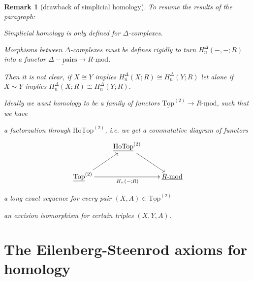 \documentclass[11pt]{book}
\numberwithin{dummy}{section}
\newtheorem{remark}[theorem]{Remark}
\theoremstyle{nonumberbreak}
\newcommand{\Rmod}{\underline{R\textrm{-}\mathrm{mod}}}
\newcommand{\toptwo}{\underline{\mathrm{Top}}^{(2)}}
\newcommand{\hotoptwo}{\underline{\mathrm{HoTop}}^{(2)}}
\newcommand{\la}{\longrightarrow}
\begin{document}
\begin{spacing}{1.4}
\begin{remark}[drawback of simplicial homology] 
To resume the results of the paragraph:
\begin{compactenum}
\item Simplicial homology is only defined for $\Delta$-complexes.
\item Morphisms between $\Delta$-complexes must be defines rigidly to turn $H_n^{\Delta}(-,-;R)$ into a functor $\underline{\Delta-\mathrm{pairs}} \la \Rmod$.
\item Then it is not clear, if $X \cong Y$ implies $H_n^{\Delta}(X;R) \cong H_n^{\Delta}(Y;R)$ let alone if $X \sim Y$ implies $H_n^{\Delta}(X;R) \cong H_n^{\Delta}(Y;R)$.
\item Ideally we want homology to be a family of functors $\toptwo \la \Rmod$, such that we have
\begin{compactenum}
\item a factorzation through $\hotoptwo$, i.e. we get a commutative diagram of functors
$$
\begin{xy}
\xymatrix{
& \hotoptwo \ar[rd] & \\ \toptwo \ar[ru] \ar[rr]_{H_n(-;R)} && \Rmod 
}
\end{xy}
$$
\item a long exact sequence for every pair $(X,A)\in \toptwo$
\item an excision isomorphism for certain triples $(X,Y,A)$.
\end{compactenum}
\end{compactenum}
\end{remark}














\section{The Eilenberg-Steenrod axioms for homology} %







\end{spacing}
\end{document}

